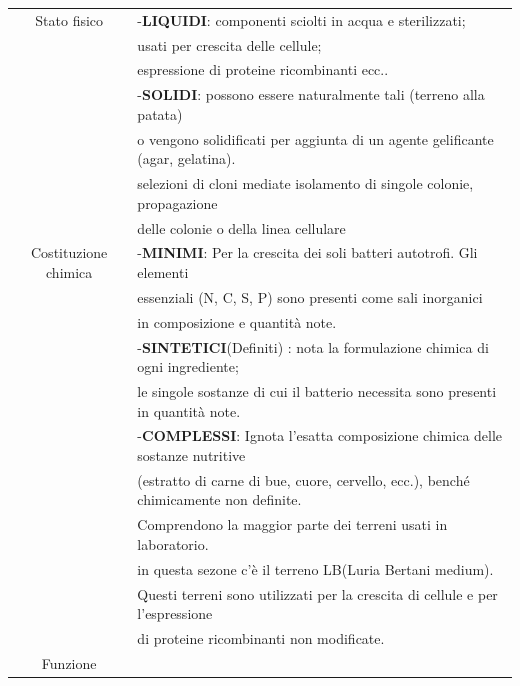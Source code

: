 \begin{tabular}{ll}
\hline
\multicolumn{1}{c}{Stato fisico}

& -\textbf{LIQUIDI}: componenti sciolti in acqua e sterilizzati; \\
\cline{1-1} &usati per crescita delle cellule;\\
&  espressione di proteine ricombinanti ecc..\\

& -\textbf{SOLIDI}:  possono essere naturalmente tali (terreno alla patata)\\
& o vengono solidificati per aggiunta di un agente gelificante (agar, gelatina). \\
&selezioni di cloni mediate isolamento di singole colonie, propagazione \\
& delle colonie o della linea cellulare \\

\hline
\multicolumn{1}{c}{Costituzione chimica}

& -\textbf{MINIMI}: Per la crescita dei soli batteri autotrofi. Gli elementi \\ \cline{1-1}
& essenziali (N, C, S, P) sono presenti come sali inorganici\\
& in composizione e quantità note.\\

& -\textbf{SINTETICI}(Definiti) : nota la formulazione chimica di ogni ingrediente; \\
& le singole sostanze di cui il batterio necessita sono presenti in quantità note.\\
& -\textbf{COMPLESSI}: Ignota l’esatta composizione chimica delle sostanze nutritive \\
& (estratto di carne di bue, cuore, cervello, ecc.), benché chimicamente non definite.\\
& Comprendono la maggior parte dei terreni usati in laboratorio. \\
& in  questa sezone c'è il terreno LB(Luria Bertani medium).\\
&  Questi terreni sono utilizzati per la crescita di cellule e per l’espressione
\\ & di proteine ricombinanti non modificate.\\

\hline
\multicolumn{1}{c}{Funzione}


\end{tabular}
